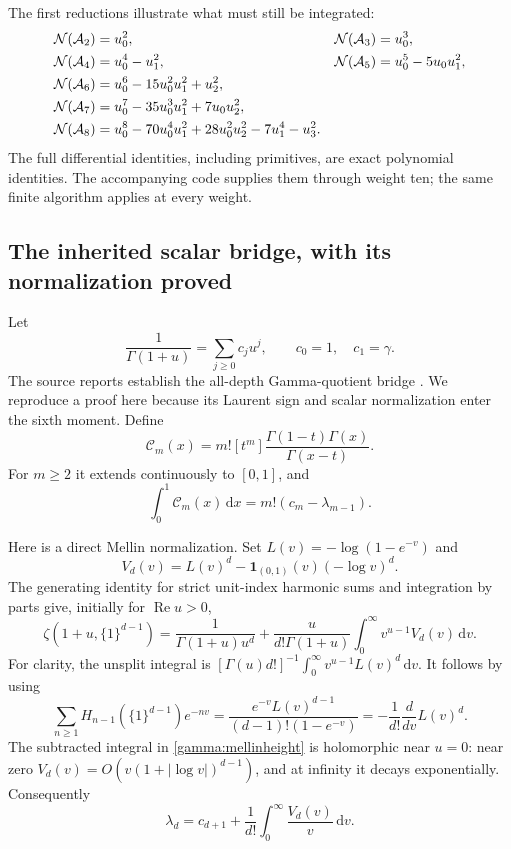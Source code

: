 \documentclass[11pt,a4paper]{article}
\numberwithin{equation}{section}
\theoremstyle{definition}
\theoremstyle{remark}
\newcommand{\re}{\operatorname{Re}}
\newcommand{\dd}{\,\mathrm d}
\newcommand{\A}{\mathcal A}
\newcommand{\NN}{\mathcal N}
\begin{document}
The first reductions illustrate what must still be integrated:
\begin{align}
 \NN(\A_2)&=u_0^2,&
 \NN(\A_3)&=u_0^3,\notag\\
 \NN(\A_4)&=u_0^4-u_1^2,&
 \NN(\A_5)&=u_0^5-5u_0u_1^2,\notag\\
 \NN(\A_6)&=u_0^6-15u_0^2u_1^2+u_2^2,\label{gamma:firstforms}\\
 \NN(\A_7)&=u_0^7-35u_0^3u_1^2+7u_0u_2^2,\notag\\
 \NN(\A_8)&=u_0^8-70u_0^4u_1^2+28u_0^2u_2^2-7u_1^4-u_3^2.
 \notag
\end{align}
The full differential identities, including primitives, are exact
polynomial identities.  The accompanying code supplies them through
weight ten; the same finite algorithm applies at every weight.

\subsection{The inherited scalar bridge, with its normalization proved}

Let
\begin{equation}\label{gamma:c}
 \frac1{\Gamma(1+u)}=\sum_{j\ge0}c_j u^j,
 \qquad c_0=1,\quad c_1=\gamma.
\end{equation}
The source reports establish the all-depth Gamma-quotient bridge
\cite[\S3]{SourceCanonical}.  We reproduce a proof here because its
Laurent sign and scalar normalization enter the sixth moment.
Define
\begin{equation}\label{gamma:C}
 \mathcal C_m(x)=m![t^m]
       \frac{\Gamma(1-t)\Gamma(x)}{\Gamma(x-t)}.
\end{equation}
For $m\ge2$ it extends continuously to $[0,1]$, and
\begin{equation}\label{gamma:Cintegral}
 \int_0^1\mathcal C_m(x)\dd x=m!(c_m-\lambda_{m-1}).
\end{equation}

Here is a direct Mellin normalization.  Set
$L(v)=-\log(1-e^{-v})$ and
\[
 V_d(v)=L(v)^d-\boldsymbol1_{(0,1)}(v)(-\log v)^d.
\]
The generating identity for strict unit-index harmonic sums and
integration by parts give, initially for $\re u>0$,
\begin{equation}\label{gamma:mellinheight}
 \zeta(1+u,\{1\}^{d-1})
 =\frac1{\Gamma(1+u)u^d}
  +\frac{u}{d!\Gamma(1+u)}\int_0^\infty v^{u-1}V_d(v)\dd v.
\end{equation}
For clarity, the unsplit integral is
$[\Gamma(u)d!]^{-1}\int_0^\infty v^{u-1}L(v)^d\dd v$.
It follows by using
\[
 \sum_{n\ge1}H_{n-1}(\{1\}^{d-1})e^{-nv}
 =\frac{e^{-v}L(v)^{d-1}}{(d-1)!(1-e^{-v})}
 =-\frac1{d!}\frac d{dv}L(v)^d.
\]
The subtracted integral in \eqref{gamma:mellinheight} is holomorphic
near $u=0$: near zero $V_d(v)=O(v(1+|\log v|)^{d-1})$, and at
infinity it decays exponentially.  Consequently
\begin{equation}\label{gamma:lambda-integral}
 \lambda_d=c_{d+1}+\frac1{d!}\int_0^\infty\frac{V_d(v)}v\dd v.
\end{equation}
\end{document}
